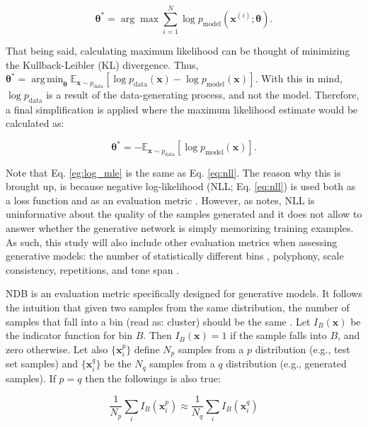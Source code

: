\documentclass[11pt, a4paper, man, floatsintext]{apa6}
\DeclareMathOperator*{\argmin}{arg\,min}
\begin{document}
\begin{equation}
    \bm{\theta^*} = \arg \max \sum_{i=1}^N \log p_{\text{model}}(\bm{x}^{(i)}; \bm{\theta}) \label{eg:log_mle}.
\end{equation}

That being said, calculating maximum likelihood can be thought of minimizing the Kullback-Leibler (KL) divergence. Thus, $\bm{\theta^*} = \argmin_{\bm{\theta}} \mathbb{E}_{\mathbf{x} \sim p_{\text{data}}} [\log p_{\text{data}} (\bm{x}) - \log p_{\text{model}} (\bm{x})]$. With this in mind, $\log p_{\text{data}}$ is a result of the data-generating process, and not the model. Therefore, a final simplification is applied where the maximum likelihood estimate would be calculated as:

\begin{equation}
    \bm{\theta^*} = - \mathbb{E}_{\mathbf{x} \sim p_{\text{data}}} [\log p_{\text{model}} (\bm{x})] \label{eq:nll}.
\end{equation}

Note that Eq. \ref{eg:log_mle} is the same as Eq. \ref{eq:nll}. The reason why this is brought up, is because negative log-likelihood (NLL; Eq. \ref{eq:nll}) is used both as a loss function and as an evaluation metric \parencite[][]{yu_seqgan_2016, borji_pros_2018}.  However, as \textcite{borji_pros_2018} notes, NLL is uninformative about the quality of the samples generated and it does not allow to answer whether the generative network is simply memorizing training examples. As such, this study will also include other evaluation metrics when assessing generative models: the number of statistically different bins \parencite[NDB;][]{richardson_gans_2018}, polyphony, scale consistency, repetitions, and tone span \parencite{mogren_c-rnn-gan_2016}.

NDB is an evaluation metric specifically designed for generative models. It follows the intuition that given two samples from the same distribution, the number of samples that fall into a bin (read as: cluster) should be the same \parencite{richardson_gans_2018}. Let $I_B(\mathbf{x})$ be the indicator function for bin $B$. Then $I_B(\mathbf{x}) = 1$ if the sample falls into $B$, and zero otherwise. Let also $\{\mathbf{x}_i^p\}$ define $N_p$ samples from a $p$ distribution (e.g., test set samples) and $\{\mathbf{x}_i^q\}$ be the $N_q$ samples from a $q$ distribution (e.g., generated samples). If $p = q$ then the followings is also true:

\begin{equation}
    \frac{1}{N_p} \sum_i I_B(\mathbf{x}_i^p) \approx \frac{1}{N_q} \sum_i I_B(\mathbf{x}_i^q)
\end{equation}
\end{document}
